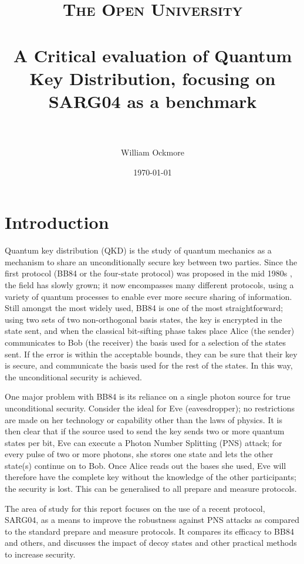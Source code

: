 \documentclass[paper=a4, fontsize=11pt]{scrartcl} %
\title{
\normalfont \normalsize
\textsc{The Open University} \\ [25pt] %
\horrule{0.5pt} \\[0.4cm] %
\huge A Critical evaluation of Quantum Key Distribution, focusing on SARG04 as a benchmark \\ %
\horrule{2pt} \\[0.5cm] %
}
\author{William Ockmore} %
\date{\normalsize\today} %
\numberwithin{equation}{section} %
\numberwithin{figure}{section} %
\numberwithin{table}{section} %
\begin{document}
\maketitle %

\tableofcontents

\clearpage
\section{Introduction}

Quantum key distribution (QKD) is the study of quantum mechanics
as a mechanism to share an unconditionally secure key between two parties. Since the first
protocol (BB84 or the four-state protocol) was proposed in the mid 1980s \citep{BB84},
the field has slowly grown; it now encompasses many different
protocols, using a variety of quantum processes to enable ever more secure
sharing of information. Still amongst the most widely
used, BB84 is one of the most straightforward; using two sets of two non-orthogonal basis states,
the key is encrypted in the state sent, and when the classical bit-sifting phase
takes place Alice (the sender) communicates to Bob (the receiver) the basis used for a selection
of the states sent. If the error is within the acceptable bounds, they can be sure that
their key is secure, and communicate the basis used for the rest of the states. In this
way, the unconditional security is achieved.

One major problem with BB84 is its reliance on a single photon source for true unconditional security.
Consider the ideal for Eve (eavesdropper); no restrictions are made on her technology or capability other
than the laws of physics. It is then clear that if the source used to send the key sends two or more quantum
states per bit, Eve can execute a Photon Number Splitting (PNS) attack; for every pulse of two or more photons,
she stores one state and lets the other state(s) continue on to Bob. Once Alice reads out the bases she used, Eve
will therefore have the complete key without the knowledge of the other participants; the security is lost. This
can be generalised to all prepare and measure protocols.

The area of study for this report focuses on the use of a recent protocol, SARG04, as a means to improve the
robustness against PNS attacks as compared to the standard prepare and measure protocols. It compares its efficacy
to BB84 and others, and discusses the impact of decoy states and other practical methods to increase security.
\end{document}
